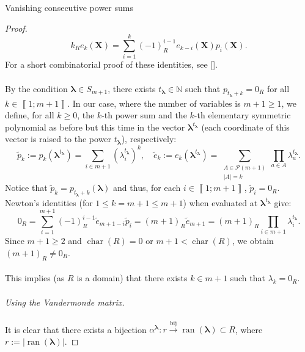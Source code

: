 \begin{appendixitem}{Vanishing consecutive power sums}
\begin{proof}
        \[
            k_R e_k\left(\mathbf{X}\right) = \sum_{i=1}^k \left(-1\right)_R^{i-1} e_{k-i}\left(\mathbf{X}\right) p_i\left(\mathbf{X}\right).
        \]
        For a short combinatorial proof of these identities, see [].
        \\\\
        By the condition \( \boldsymbol{\lambda} \in S_{m+1} \), there exists \( t_{\boldsymbol{\lambda}} \in \mathbb{N} \) such that \( p_{t_{\boldsymbol{\lambda}}+k} = 0_{R} \) for all \( k \in \left\llbracket 1;m+1 \right\rrbracket \). In our case, where the number of variables is \( m+1 \geq 1 \), we define, for all \( k \geq 0 \), the \( k \)-th power sum and the \( k \)-th elementary symmetric polynomial as before but this time in the vector \( \boldsymbol{\lambda}^{t_{\boldsymbol{\lambda}}} \) (each coordinate of this vector is raised to the power \( t_{\boldsymbol{\lambda}} \)), respectively:
        \[
            \tilde{p}_k := p_k\left(\boldsymbol{\lambda}^{t_{\boldsymbol{\lambda}}}\right) = \sum_{i \in m+1} \left(\lambda_i^{t_{\boldsymbol{\lambda}}}\right)^k,\quad \tilde{e}_k := e_k\left(\boldsymbol{\lambda}^{t_{\boldsymbol{\lambda}}}\right) = \sum_{\substack{A \in \mathscr{P}\left(m+1\right)\\\left|A\right| = k}} \prod_{a \in A} \lambda_a^{t_{\boldsymbol{\lambda}}}.
        \]
        Notice that \( \tilde{p}_k = p_{t_{\boldsymbol{\lambda}} + k}\left(\boldsymbol{\lambda}\right) \) and thus, for each \( i \in \left\llbracket 1;m+1 \right\rrbracket \), \( \tilde{p}_i = 0_{R} \). Newton's identities (for \( 1\leq k = m+1\leq m+1 \)) when evaluated at \( \boldsymbol{\lambda}^{t_{\boldsymbol{\lambda}}} \) give:
        \[
            0_{R} = \sum_{i=1}^{m+1} \left(-1\right)_R^{i-1} \tilde{e}_{m+1-i} \tilde{p}_{i} = \left(m+1\right)_{R} \tilde{e}_{m+1} = \left(m+1\right)_{R} \prod_{i \in m+1} \lambda_i^{t_{\boldsymbol{\lambda}}}.
        \]
        Since \( m+1 \geq 2 \) and \( \operatorname{char}\left(R\right) = 0 \) or \( m+1 < \operatorname{char}\left(R\right) \), we obtain \( \left(m+1\right)_{R} \neq 0_{R} \).
        \\\\
        This implies (as \( R \) is a domain) that there exists \( k \in m+1 \) such that \( \lambda_k = 0_{R} \).
        \\\\
        \textit{Using the Vandermonde matrix.}
        \\\\
        It is clear that there exists a bijection \( \alpha^{\boldsymbol{\lambda}} \colon r \xrightarrow{\text{bij}} \operatorname{ran}\left(\boldsymbol{\lambda}\right) \subset R \), where \( r := \left|\operatorname{ran}\left(\boldsymbol{\lambda}\right)\right| \).

\end{proof}
\end{appendixitem}

